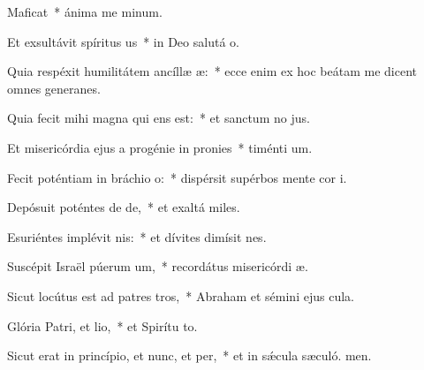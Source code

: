 \item Maficat~* ánima me minum.
\item Et exsultávit spíritus us~* in Deo salutá o.
\item Quia respéxit humilitátem ancíllæ æ:~* ecce enim ex hoc beátam me dicent omnes generanes.
\item Quia fecit mihi magna qui ens est:~* et sanctum no jus.
\item Et misericórdia ejus a progénie in pronies~* timénti um.
\item Fecit poténtiam in bráchio o:~* dispérsit supérbos mente cor i.
\item Depósuit poténtes de de,~* et exaltá miles.
\item Esuriéntes implévit nis:~* et dívites dimísit nes.
\item Suscépit Israël púerum um,~* recordátus misericórdi æ.
\item Sicut locútus est ad patres tros,~* Abraham et sémini ejus  cula.
\item Glória Patri, et lio,~* et Spirítu to.
\item Sicut erat in princípio, et nunc, et per,~* et in sǽcula sæculó. men.
